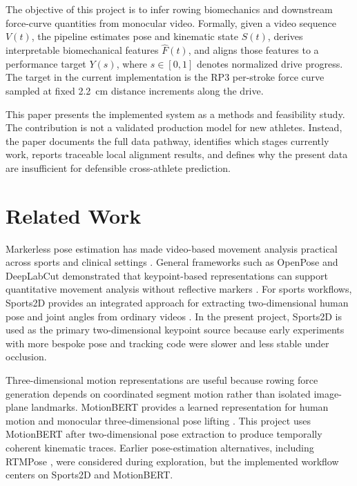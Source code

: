 \documentclass[11pt]{article}
\begin{document}
The objective of this project is to infer rowing biomechanics and downstream force-curve quantities from monocular video. Formally, given a video sequence \(V(t)\), the pipeline estimates pose and kinematic state \(\hat{S}(t)\), derives interpretable biomechanical features \(\hat{F}(t)\), and aligns those features to a performance target \(Y(s)\), where \(s \in [0,1]\) denotes normalized drive progress. The target in the current implementation is the RP3 per-stroke force curve sampled at fixed \SI{2.2}{cm} distance increments along the drive.

This paper presents the implemented system as a methods and feasibility study. The contribution is not a validated production model for new athletes. Instead, the paper documents the full data pathway, identifies which stages currently work, reports traceable local alignment results, and defines why the present data are insufficient for defensible cross-athlete prediction.

\section{Related Work}
Markerless pose estimation has made video-based movement analysis practical across sports and clinical settings \citep{colyer2018vision,kidzinski2020singlecamera,boswell2023smartphone}. General frameworks such as OpenPose and DeepLabCut demonstrated that keypoint-based representations can support quantitative movement analysis without reflective markers \citep{cao2019openpose,mathis2018deeplabcut}. For sports workflows, Sports2D provides an integrated approach for extracting two-dimensional human pose and joint angles from ordinary videos \citep{pagnon2024sports2d}. In the present project, Sports2D is used as the primary two-dimensional keypoint source because early experiments with more bespoke pose and tracking code were slower and less stable under occlusion.

Three-dimensional motion representations are useful because rowing force generation depends on coordinated segment motion rather than isolated image-plane landmarks. MotionBERT provides a learned representation for human motion and monocular three-dimensional pose lifting \citep{zhu2023motionbert}. This project uses MotionBERT after two-dimensional pose extraction to produce temporally coherent kinematic traces. Earlier pose-estimation alternatives, including RTMPose \citep{jiang2023rtmpose}, were considered during exploration, but the implemented workflow centers on Sports2D and MotionBERT.
\end{document}
